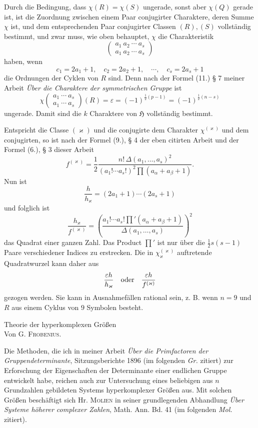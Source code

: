 \documentclass[11pt]{article}
\newcommand{\Hgr}{\mathfrak{H}}
\newcommand{\eps}{\varepsilon}
\newcommand{\frobtitle}[1]{\begin{center}{\Large #1}\\[0.75em]Von G. \textsc{Frobenius}.\end{center}\vspace{0.5em}}
\newcommand{\ch}[2]{\left(\begin{smallmatrix}#1\\#2\end{smallmatrix}\right)}
\begin{document}
Durch die Bedingung, dass $\chi(R)=\chi(S)$ ungerade, sonst aber $\chi(Q)$ gerade ist, ist die Zuordnung zwischen einem Paar conjugirter Charaktere, deren Summe $\chi$ ist, und dem entsprechenden Paar conjugirter Classen $(R),(S)$ vollständig bestimmt, und zwar muss, wie oben behauptet, $\chi$ die Charakteristik
\[
 \ch{a_1\ a_2\ \cdots\ a_s}{a_1\ a_2\ \cdots\ a_s}
\]
haben, wenn
\[
 c_1=2a_1+1,	\quad c_2=2a_2+1,	\quad \cdots,	\quad c_s=2a_s+1
\]
die Ordnungen der Cyklen von $R$ sind. Denn nach der Formel (11.) § 7 meiner Arbeit \emph{Über die Charaktere der symmetrischen Gruppe} ist
\[
 \chi\ch{a_1\ \cdots\ a_s}{a_1\ \cdots\ a_s}(R)=\eps=(-1)^{\frac12(p-1)}=(-1)^{\frac12(n-s)}
\]
ungerade. Damit sind die $k$ Charaktere von $\Hgr$ vollständig bestimmt.

Entspricht die Classe $(\varkappa)$ und die conjugirte dem Charakter $\chi^{(\varkappa)}$ und dem conjugirten, so ist nach der Formel (9.), § 4 der eben citirten Arbeit und der Formel (6.), § 3 dieser Arbeit
\[
 f^{(\varkappa)}=\frac12\frac{n!\,\Delta(a_1,\ldots,a_s)^2}{(a_1!\cdots a_s!)^2\prod(a_\alpha+a_\beta+1)}.
\]
Nun ist
\[
 \frac{h}{h_\varkappa}=(2a_1+1)\cdots(2a_s+1)
\]
und folglich ist
\begin{equation}\tag{2.}
 \frac{h_\varkappa}{f^{(\varkappa)}}=\left(\frac{a_1!\cdots a_s!\prod'(a_\alpha+a_\beta+1)}{\Delta(a_1,\ldots,a_s)}\right)^2
\end{equation}
das Quadrat einer ganzen Zahl. Das Product $\prod'$ ist nur über die $\frac12s(s-1)$ Paare verschiedener Indices zu erstrecken. Die in $\chi^{(\varkappa)}_\varkappa$ auftretende Quadratwurzel kann daher aus
\[
 \frac{\eps h}{h_\varkappa}\quad\hbox{oder}\quad \frac{\eps h}{f^{(\varkappa)}}
\]
gezogen werden. Sie kann in Ausnahmefällen rational sein, z. B. wenn $n=9$ und $R$ aus einem Cyklus von $9$ Symbolen besteht.

\clearpage

\frobtitle{Theorie der hyperkomplexen Größen}

Die Methoden, die ich in meiner Arbeit \emph{Über die Primfactoren der Gruppendeterminante}, Sitzungsberichte 1896 (im folgenden \emph{Gr.} zitiert) zur Erforschung der Eigenschaften der Determinante einer endlichen Gruppe entwickelt habe, reichen auch zur Untersuchung eines beliebigen aus $n$ Grundzahlen gebildeten Systems hyperkomplexer Größen aus. Mit solchen Größen beschäftigt sich Hr. \textsc{Molien} in seiner grundlegenden Abhandlung \emph{Über Systeme höherer complexer Zahlen}, Math. Ann. Bd. 41 (im folgenden \emph{Mol.} zitiert).
\end{document}
